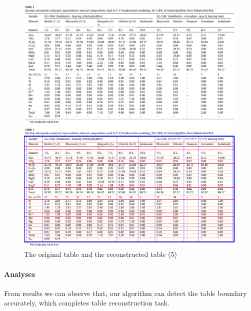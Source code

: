 \documentclass[12pt, a4paper]{article}
\theoremstyle{definition}
\begin{document}
\begin{figure}[htbp]
	\centering
		\begin{minipage}[t]{0.9\linewidth}
		\centering
		\includegraphics[width=\linewidth]{5.jpg}
		\end{minipage}
		\linebreak 
		\begin{minipage}[t]{0.9\linewidth}
		\centering
		\includegraphics[width=\linewidth]{reconstructed_5.png}
		\end{minipage}
	\caption{The original table and the reconstructed table (5)}
	\label{fig5}
\end{figure}

\paragraph{Analyses} From results we can observe that, our algorithm can detect the table boundary accurately, which completes table reconstruction task.
\end{document}

